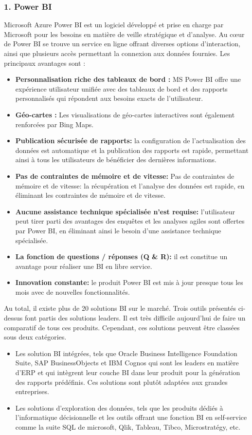 \documentclass[french, a4paper, 12pt]{report}
\begin{document}
\subsubsection{1. Power BI}
Microsoft Azure Power BI est un logiciel développé et prise en charge par Microsoft pour les besoins en matière de veille stratégique et d'analyse. Au cœur de Power BI se trouve un service en ligne offrant diverses options d’interaction, ainsi que plusieurs accès permettant la connexion aux données fournies.
Les principaux avantages sont :
\begin{itemize}
\item \textbf{Personnalisation riche des tableaux de bord :}  MS Power BI offre une expérience utilisateur unifiée avec des tableaux de bord et des rapports personnalisés qui répondent aux besoins exacts de l'utilisateur. 
\item \textbf{Géo-cartes :} Les visualisations de géo-cartes interactives sont également renforcées par Bing Maps.
\item \textbf{Publication sécurisée de rapports:}  la configuration de l'actualisation des données est automatique et la publication des rapports est rapide, permettant ainsi à tous les utilisateurs de bénéficier des dernières informations.
\item \textbf{Pas de contraintes de mémoire et de vitesse:} Pas de contraintes de mémoire et de vitesse: la récupération et l’analyse des données est rapide, en éliminant les contraintes de mémoire et de vitesse.
\item \textbf{Aucune assistance technique spécialisée n’est requise:}  l’utilisateur peut tirer parti des avantages des enquêtes et les analyses agiles sont offertes par Power BI, en éliminant ainsi le besoin d’une assistance technique spécialisée.
\item \textbf{La fonction de questions / réponses (Q & R):} il est constitue un avantage pour réaliser une BI en libre service.
\item \textbf{Innovation constante:}  le produit Power BI est mis à jour presque tous les mois avec de nouvelles fonctionnalités.\\
\end{itemize} 
Au total, il existe plus de 20 solutions BI sur le marché. Trois outils présentés ci-dessus font partis des solutions leaders. Il est très difficile aujourd’hui de faire un comparatif de tous ces produits. Cependant, ces solutions peuvent être classées sous deux catégories.
\begin{itemize}
\item \textbf{} Les solution BI intégrées, tels que Oracle Business Intelligence Foundation Suite, SAP BusinessObjects et IBM Cognos qui sont les leaders en matière d’ERP et qui intègrent leur couche BI dans leur produit pour la génération des rapports prédéfinis. Ces solutions sont plutôt adaptées aux grandes entreprises.
\item \textbf{} Les solutions d’exploration des données, tels que les produits dédiés à l’informatique décisionnelle et les outils offrant une fonction BI en self-service comme la suite SQL de microsoft, Qlik, Tableau, Tibco, Microstratégy, etc. 

\end{itemize} 
\end{document}
